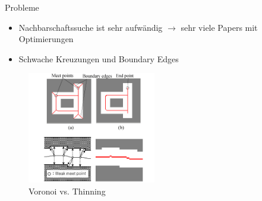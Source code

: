 \begin{frame}{Probleme}
 \begin{itemize}
  \item Nachbarschaftssuche ist sehr aufwändig $\to$ sehr viele Papers mit Optimierungen
  \item Schwache Kreuzungen und Boundary Edges
 \end{itemize}
\begin{figure}[h]
 \centering
 \includegraphics[width=0.5\textwidth]{./material/thinningvsvoronoi.png}
 \caption{Voronoi vs. Thinning \cite{KoBangYun}}
 \label{fig:egal}
\end{figure}

 
\end{frame}
